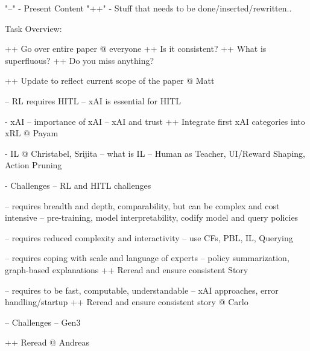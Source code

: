 "--" - Present Content
"++" - Stuff that needs to be done/inserted/rewritten..


Task Overview:

++ Go over entire paper @ everyone
    ++ Is it consistent?
    ++ What is superfluous?
    ++ Do you miss anything?

++ Update to reflect current scope of the paper @ Matt

-- RL requires HITL
-- xAI is essential for HITL

- xAI
-- importance of xAI
-- xAI and trust 
++ Integrate first xAI categories into xRL @ Payam

- IL @ Christabel, Srijita
-- what is IL
-- Human as Teacher, UI/Reward Shaping, Action Pruning

- Challenges
-- RL and HITL challenges

-- requires breadth and depth, comparability, but can be complex and cost intensive
-- pre-training, model interpretability, codify model and query policies

-- requires reduced complexity and interactivity
-- use CFs, PBL, IL, Querying

-- requires coping with scale and language of experts
-- policy summarization, graph-based explanations
++ Reread and ensure consistent Story

-- requires to be fast, computable, understandable
-- xAI approaches, error handling/startup
++ Reread and ensure consistent story @ Carlo

-- Challenges
-- Gen3

++ Reread @ Andreas